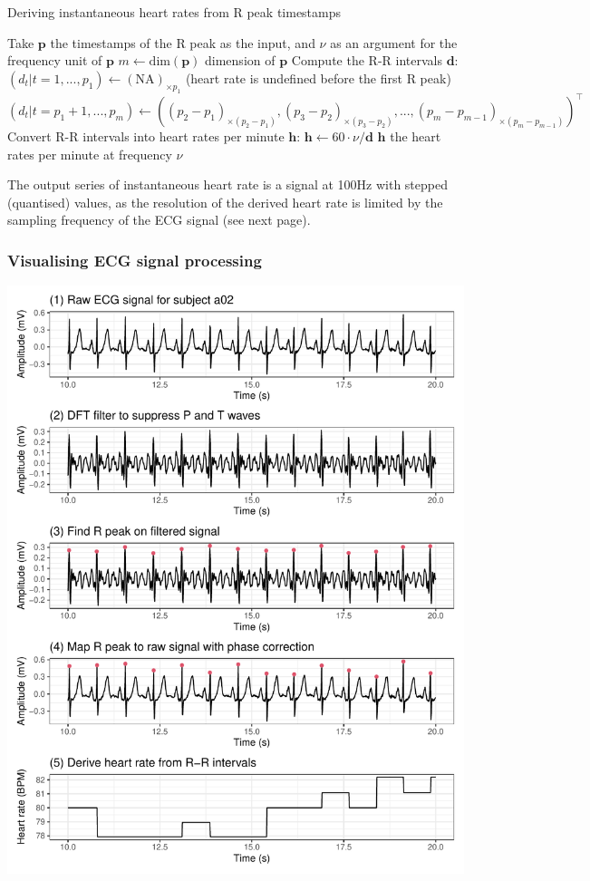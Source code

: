 \documentclass[
]{article}
\begin{document}
\begin{algorithm}
\caption{Deriving instantaneous heart rates from R peak timestamps}
\begin{algorithmic}[1]
\STATE Take $\mathbf{p}$ the timestamps of the R peak as the input, and $\nu$ as an argument for the frequency unit of $\mathbf{p}$
\STATE $m \leftarrow \text{dim}(\mathbf{p})$ dimension of $\mathbf{p}$
\STATE Compute the R-R intervals $\mathbf{d}$:
\STATE $(d_t | t = 1, ..., p_1) \leftarrow (\text{NA})_{\times p_1}$ (heart rate is undefined before the first R peak)
\STATE $(d_t | t = p_1 + 1, ..., p_{m}) \leftarrow ((p_2 - p_1)_{\times (p_2 - p_1)}, (p_3 - p_2)_{\times (p_3 - p_2)}, ..., (p_{m} - p_{m - 1})_{\times (p_{m} - p_{m - 1})})^\top$
\STATE Convert R-R intervals into heart rates per minute $\mathbf{h}$:
\STATE $\mathbf{h} \leftarrow 60 \cdot \nu / \mathbf{d}$
\RETURN $\mathbf{h}$ the heart rates per minute at frequency $\nu$
\end{algorithmic}
\end{algorithm}

The output series of instantaneous heart rate is a signal at 100Hz with
stepped (quantised) values, as the resolution of the derived heart rate
is limited by the sampling frequency of the ECG signal (see next page).

\hypertarget{visual}{%
\subsubsection{Visualising ECG signal processing}\label{visual}}

\begin{center}\includegraphics{report_files/figure-latex/ecg-process-1} \end{center}
\end{document}
